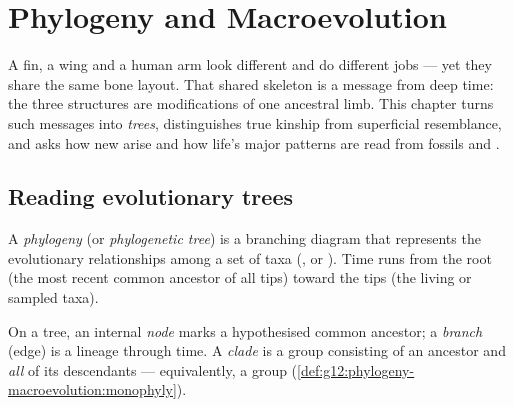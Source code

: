 \chapter{Phylogeny and Macroevolution}\label{ch:g12:phylogeny-macroevolution}

A fin, a wing and a human arm look different and do different jobs --- yet
they share the same bone layout. That shared skeleton is a message from
deep time: the three structures are modifications of one ancestral
limb. This chapter turns such messages into \emph{trees}, distinguishes
true kinship from superficial resemblance, and asks how new 
arise and how life's major patterns are read from fossils and .

\section{Reading evolutionary trees}

\begin{definition}[Phylogeny]\label{def:g12:phylogeny-macroevolution:phylogeny}
A \emph{phylogeny} (or \emph{phylogenetic
tree}) is a branching diagram that represents
the evolutionary relationships among a set of taxa (, 
or ). Time runs from the root (the most recent common ancestor of
all tips) toward the tips (the living or sampled taxa).
\end{definition}

\begin{definition}\label{def:g12:phylogeny-macroevolution:node}
On a tree, an internal \emph{node} marks a
hypothesised common ancestor; a \emph{branch}
(edge) is a lineage through time. A \emph{clade} is a
group consisting of an ancestor and \emph{all} of its descendants ---
equivalently, a  group (\cref{def:g12:phylogeny-macroevolution:monophyly}).
\end{definition}

